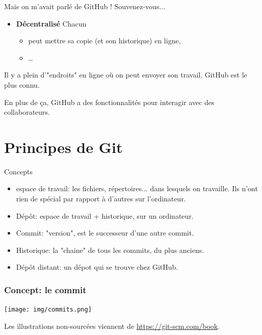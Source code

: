 \documentclass{beamer}
\begin{document}
\begin{frame}{Mais on m'avait parlé de GitHub !}
    Souvenez-vous...
    \begin{itemize}
        \item \textbf{Décentralisé} Chacun
            \begin{itemize}
                \item peut mettre sa copie (et son historique) en ligne,
                \item \dots
            \end{itemize}
    \end{itemize}

    Il y a plein d'"endroits" en ligne o\`u on peut envoyer son travail, GitHub
    est le plus connu.

    En plus de ça, GitHub a des fonctionnalités pour interagir avec des collaborateurs.
\end{frame}

\section{Principes de Git}

\begin{frame}{Concepts}
    \begin{itemize}
        \item espace de travail: les fichiers, répertoires... dans lesquels on
            travaille. Ils n'ont rien de spécial par rapport à d'autres sur
            l'ordinateur.
        \item Dépôt: espace de travail + historique, sur un ordinateur.
        \item Commit: "version", est le successeur d'une autre commit.
        \item Historique: la "chaine" de tous les commits, du plus anciens.
        \item Dépôt distant: un dépot qui se trouve chez GitHub.
    \end{itemize}
\end{frame}

\begin{frame}
\frametitle{Concept: le \textbf{commit}}

\begin{center}
    \texttt{[image: img/commits.png]}
\end{center}
\footnotesize{Les illustrations non-sourcées viennent de \url{https://git-scm.com/book}.}
\end{frame}
\end{document}
